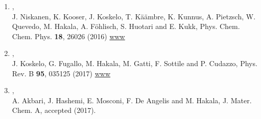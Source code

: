 \documentclass[12pt,a4]{report}
\begin{document}
\begin{enumerate}
\item{},\\
J. Niskanen, K. Kooser, J. Koskelo, T. K{\"a}{\"a}mbre, K. Kunnus, A. Pietzsch, W. Quevedo, M. Hakala, A. F{\"o}hlisch, S. Huotari and E. Kukk, Phys. Chem. Chem. Phys. {\bf 18}, 26026 (2016)
\href{http://pubs.rsc.org/en/Content/ArticleLanding/2016/CP/C6CP03220F#!divAbstract}{www}



\item{},\\
J. Koskelo, G. Fugallo, M. Hakala, M. Gatti, F. Sottile and P. Cudazzo, Phys. Rev. B {\bf 95}, 035125 (2017)
\href{http://journals.aps.org/prb/abstract/10.1103/PhysRevB.95.035125}{www}

\item{},\\
A. Akbari, J. Hashemi, E. Mosconi, F. De Angelis and M. Hakala, J. Mater. Chem. A, accepted (2017).















\end{enumerate}
\end{document}

